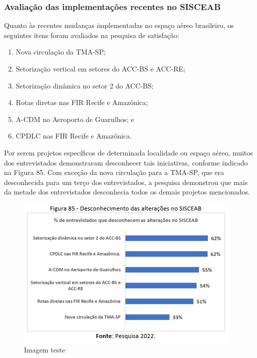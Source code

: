 \documentclass[
]{book}
\begin{document}
\hypertarget{avaliauxe7uxe3o-das-implementauxe7uxf5es-recentes-no-sisceab}{%
\subsubsection{Avaliação das implementações recentes no SISCEAB}\label{avaliauxe7uxe3o-das-implementauxe7uxf5es-recentes-no-sisceab}}

Quanto às recentes mudanças implementadas no espaço aéreo brasileiro, os seguintes itens foram avaliados na pesquisa de satisfação:

\begin{enumerate}
\def\labelenumi{\alph{enumi})}
\item
  Nova circulação da TMA-SP;
\item
  Setorização vertical em setores do ACC-BS e ACC-RE;
\item
  Setorização dinâmica no setor 2 do ACC-BS;
\item
  Rotas diretas nas FIR Recife e Amazônica;
\item
  A-CDM no Aeroporto de Guarulhos; e
\item
  CPDLC nas FIR Recife e Amazônica.
\end{enumerate}

Por serem projetos específicos de determinada localidade ou espaço aéreo, muitos dos entrevistados demonstraram desconhecer tais iniciativas, conforme indicado na Figura 85. Com exceção da nova circulação para a TMA-SP, que era desconhecida para um terço dos entrevistados, a pesquisa demonstrou que mais da metade dos entrevistados desconhecia todos os demais projetos mencionados.

\begin{figure}
\centering
\includegraphics{imagens/fig72.jpg}
\caption{Imagem teste}
\end{figure}
\end{document}

